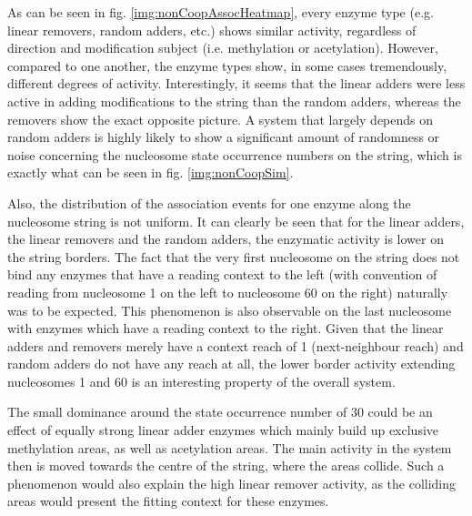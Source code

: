         As can be seen in fig. \ref{img:nonCoopAssocHeatmap}, every enzyme type (e.g. linear removers, random adders, etc.) shows similar activity, regardless of direction and modification subject (i.e. methylation or acetylation). However, compared to one another, the enzyme types show, in some cases tremendously, different degrees of activity. Interestingly, it seems that the linear adders were less active in adding modifications to the string than the random adders, whereas the removers show the exact opposite picture. A system that largely depends on random adders is highly likely to show a significant amount of randomness or noise concerning the nucleosome state occurrence numbers on the string, which is exactly what can be seen in fig. \ref{img:nonCoopSim}.

        Also, the distribution of the association events for one enzyme along the nucleosome string is not uniform. It can clearly be seen that for the linear adders, the linear removers and the random adders, the enzymatic activity is lower on the string borders. The fact that the very first nucleosome on the string does not bind any enzymes that have a reading context to the left (with convention of reading from nucleosome 1 on the left to nucleosome 60 on the right) naturally was to be expected. This phenomenon is also observable on the last nucleosome with enzymes which have a reading context to the right. Given that the linear adders and removers merely have a context reach of 1 (next-neighbour reach) and random adders do not have any reach at all, the lower border activity extending nucleosomes 1 and 60 is an interesting property of the overall system.

        The small dominance around the state occurrence number of 30 could be an effect of equally strong linear adder enzymes which mainly build up exclusive methylation areas, as well as acetylation areas. The main activity in the system then is moved towards the centre of the string, where the areas collide. Such a phenomenon would also explain the high linear remover activity, as the colliding areas would present the fitting context for these enzymes.

